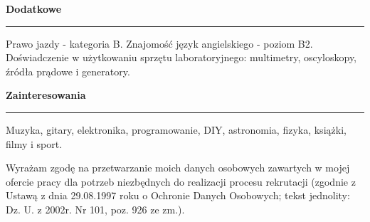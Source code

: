 \documentclass{article}
\newcommand{\header}[1] 
{
	\textbf{\large #1}
	\vspace{0.005\textheight}
	\hrule 
	\vspace{0.005\textheight}
}
\begin{document}

\header{Dodatkowe}
Prawo jazdy - kategoria B.
Znajomość język angielskiego - poziom B2.\\
Doświadczenie w użytkowaniu sprzętu laboratoryjnego: multimetry, oscyloskopy, źródła prądowe i generatory.
\header{Zainteresowania}
Muzyka, gitary, elektronika, programowanie, DIY, astronomia, fizyka, książki, filmy i sport.
\vspace{0.05\textheight}
\noindent\newline
\scriptsize
\begin{minipage}{\textwidth}
	 Wyrażam zgodę na przetwarzanie moich danych osobowych zawartych w mojej ofercie pracy dla potrzeb niezbędnych do realizacji procesu rekrutacji (zgodnie z Ustawą z dnia 29.08.1997 roku o Ochronie Danych Osobowych; tekst jednolity: Dz. U. z 2002r. Nr 101, poz. 926 ze zm.).
 \end{minipage}
 
\end{document}

